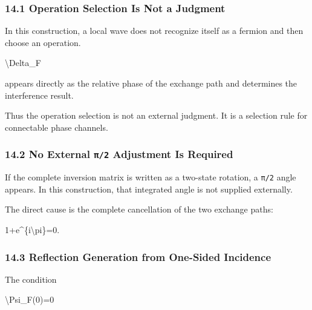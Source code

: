\documentclass[
  a4paper,
]{article}
\newenvironment{Shaded}{}{}
\newcommand{\NormalTok}[1]{#1}
\begin{document}
\subsubsection{14.1 Operation Selection Is Not a
Judgment}\label{operation-selection-is-not-a-judgment}

In this construction, a local wave does not recognize itself as a
fermion and then choose an operation.

\begin{Shaded}
\begin{Highlighting}[]
\NormalTok{\textbackslash{}Delta\_F}
\end{Highlighting}
\end{Shaded}

appears directly as the relative phase of the exchange path and
determines the interference result.

Thus the operation selection is not an external judgment. It is a
selection rule for connectable phase channels.

\subsubsection{\texorpdfstring{14.2 No External \texttt{π/2} Adjustment
Is
Required}{14.2 No External π/2 Adjustment Is Required}}\label{no-external-ux3c02-adjustment-is-required}

If the complete inversion matrix is written as a two-state rotation, a
\texttt{π/2} angle appears. In this construction, that integrated angle
is not supplied externally.

The direct cause is the complete cancellation of the two exchange paths:

\begin{Shaded}
\begin{Highlighting}[]
\NormalTok{1+e\^{}\{i\textbackslash{}pi\}=0.}
\end{Highlighting}
\end{Shaded}

\subsubsection{14.3 Reflection Generation from One-Sided
Incidence}\label{reflection-generation-from-one-sided-incidence}

The condition

\begin{Shaded}
\begin{Highlighting}[]
\NormalTok{\textbackslash{}Psi\_F(0)=0}
\end{Highlighting}
\end{Shaded}
\end{document}
